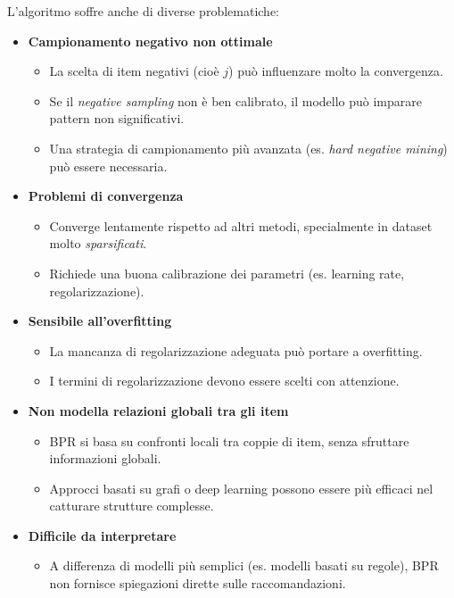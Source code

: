 \documentclass{article}
\begin{document}
L'algoritmo soffre anche di diverse problematiche:

\begin{itemize}
    \item \textbf{Campionamento negativo non ottimale}
    \begin{itemize}
        \item La scelta di item negativi (cioè \(j\)) può influenzare molto la convergenza.
        \item Se il \textit{negative sampling} non è ben calibrato, il modello può imparare pattern non significativi.
        \item Una strategia di campionamento più avanzata (es. \textit{hard negative mining}) può essere necessaria.
    \end{itemize}
    
    \item \textbf{Problemi di convergenza}
    \begin{itemize}
        \item Converge lentamente rispetto ad altri metodi, specialmente in dataset molto \textit{sparsificati}.
        \item Richiede una buona calibrazione dei parametri (es. learning rate, regolarizzazione).
    \end{itemize}
    
    \item \textbf{Sensibile all'overfitting}
    \begin{itemize}
        \item La mancanza di regolarizzazione adeguata può portare a overfitting.
        \item I termini di regolarizzazione devono essere scelti con attenzione.
    \end{itemize}
    
    \item \textbf{Non modella relazioni globali tra gli item}
    \begin{itemize}
        \item BPR si basa su confronti locali tra coppie di item, senza sfruttare informazioni globali.
        \item Approcci basati su grafi o deep learning possono essere più efficaci nel catturare strutture complesse.
    \end{itemize}
    
    \item \textbf{Difficile da interpretare}
    \begin{itemize}
        \item A differenza di modelli più semplici (es. modelli basati su regole), BPR non fornisce spiegazioni dirette sulle raccomandazioni.
    \end{itemize}
\end{itemize}






\end{document}
